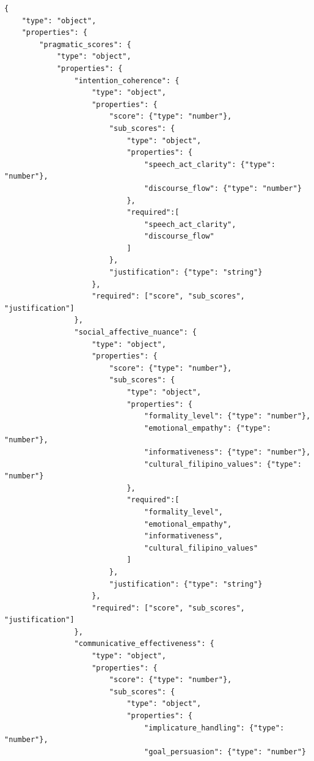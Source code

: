 \begin{verbatim}
{
    "type": "object",
    "properties": {
        "pragmatic_scores": {
            "type": "object",
            "properties": {
                "intention_coherence": {
                    "type": "object",
                    "properties": {
                        "score": {"type": "number"},
                        "sub_scores": {
                            "type": "object",
                            "properties": {
                                "speech_act_clarity": {"type": "number"},
                                "discourse_flow": {"type": "number"}
                            },
                            "required":[
                                "speech_act_clarity", 
                                "discourse_flow"
                            ]
                        },
                        "justification": {"type": "string"}
                    },
                    "required": ["score", "sub_scores", "justification"]
                },
                "social_affective_nuance": {
                    "type": "object",
                    "properties": {
                        "score": {"type": "number"},
                        "sub_scores": {
                            "type": "object",
                            "properties": {
                                "formality_level": {"type": "number"},
                                "emotional_empathy": {"type": "number"},
                                "informativeness": {"type": "number"},
                                "cultural_filipino_values": {"type": "number"}
                            },
                            "required":[
                                "formality_level",
                                "emotional_empathy",
                                "informativeness",
                                "cultural_filipino_values"
                            ]
                        },
                        "justification": {"type": "string"}
                    },
                    "required": ["score", "sub_scores", "justification"]
                },
                "communicative_effectiveness": {
                    "type": "object",
                    "properties": {
                        "score": {"type": "number"},
                        "sub_scores": {
                            "type": "object",
                            "properties": {
                                "implicature_handling": {"type": "number"},
                                "goal_persuasion": {"type": "number"}

\end{verbatim}
